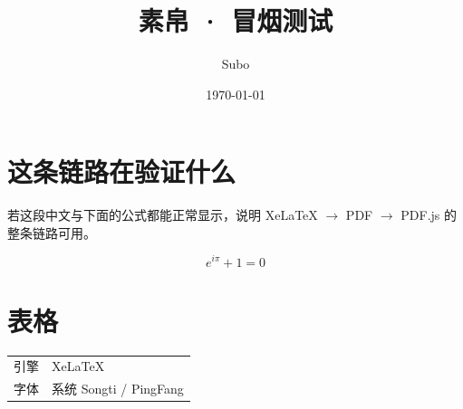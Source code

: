\documentclass[UTF8]{ctexart}
\title{素帛 · 冒烟测试}
\author{Subo}
\date{\today}
\begin{document}
\maketitle

\section{这条链路在验证什么}
若这段中文与下面的公式都能正常显示，说明
XeLaTeX $\rightarrow$ PDF $\rightarrow$ PDF.js 的整条链路可用。

\begin{equation}
  e^{i\pi} + 1 = 0
\end{equation}

\section{表格}
\begin{tabular}{ll}
  引擎 & XeLaTeX \\
  字体 & 系统 Songti / PingFang \\
\end{tabular}
\end{document}
